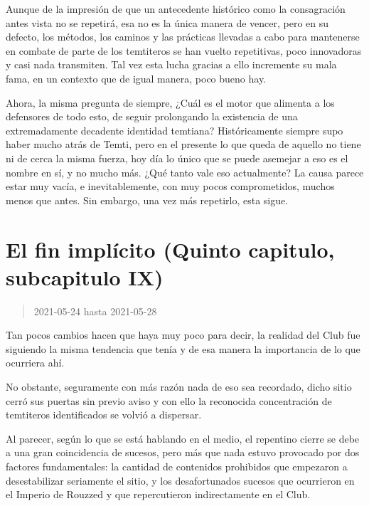 \documentclass[
  spanish,
]{book}
\begin{document}
Aunque de la impresión de que un antecedente histórico como la consagración antes vista no se repetirá, esa no es la única manera de vencer, pero en su defecto, los métodos, los caminos y las prácticas llevadas a cabo para mantenerse en combate de parte de los temtiteros se han vuelto repetitivas, poco innovadoras y casi nada transmiten. Tal vez esta lucha gracias a ello incremente su mala fama, en un contexto que de igual manera, poco bueno hay.

Ahora, la misma pregunta de siempre, ¿Cuál es el motor que alimenta a los defensores de todo esto, de seguir prolongando la existencia de una extremadamente decadente identidad temtiana?
Históricamente siempre supo haber mucho atrás de Temti, pero en el presente lo que queda de aquello no tiene ni de cerca la misma fuerza, hoy día lo único que se puede asemejar a eso es el nombre en sí, y no mucho más. ¿Qué tanto vale eso actualmente?
La causa parece estar muy vacía, e inevitablemente, con muy pocos comprometidos, muchos menos que antes. Sin embargo, una vez más repetirlo, esta sigue.

\hypertarget{el-fin-impluxedcito-quinto-capitulo-subcapitulo-ix}{%
\section{El fin implícito (Quinto capitulo, subcapitulo IX)}\label{el-fin-impluxedcito-quinto-capitulo-subcapitulo-ix}}

\begin{quote}
2021-05-24 hasta 2021-05-28
\end{quote}

Tan pocos cambios hacen que haya muy poco para decir, la realidad del Club fue siguiendo la misma tendencia que tenía y de esa manera la importancia de lo que ocurriera ahí.

No obstante, seguramente con más razón nada de eso sea recordado, dicho sitio cerró sus puertas sin previo aviso y con ello la reconocida concentración de temtiteros identificados se volvió a dispersar.

Al parecer, según lo que se está hablando en el medio, el repentino cierre se debe a una gran coincidencia de sucesos, pero más que nada estuvo provocado por dos factores fundamentales: la cantidad de contenidos prohibidos que empezaron a desestabilizar seriamente el sitio, y los desafortunados sucesos que ocurrieron en el Imperio de Rouzzed y que repercutieron indirectamente en el Club.
\end{document}
